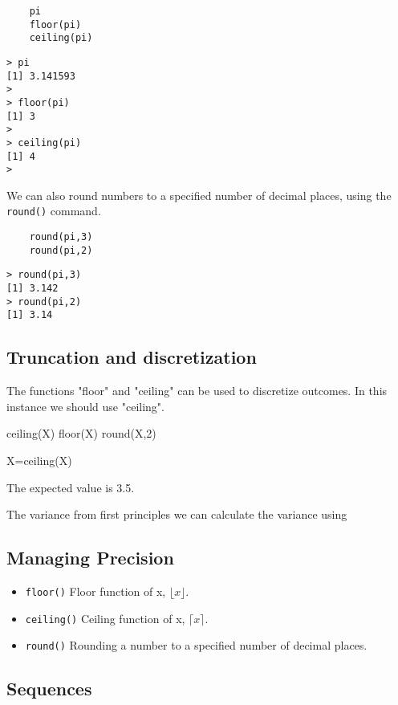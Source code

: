 \documentclass[a4paper,12pt]{article}
\begin{document}
\begin{framed}
	\begin{verbatim}
	pi
	floor(pi)
	ceiling(pi)
	\end{verbatim}
\end{framed}
\begin{verbatim}
> pi
[1] 3.141593
>
> floor(pi)
[1] 3
>
> ceiling(pi)
[1] 4
>
\end{verbatim}
We can also round numbers to a specified number of decimal places, using the \texttt{round()} command.
\begin{framed}
	\begin{verbatim}
	round(pi,3)
	round(pi,2)
	\end{verbatim}
\end{framed}
\begin{verbatim}
> round(pi,3)
[1] 3.142
> round(pi,2)
[1] 3.14
\end{verbatim}


\subsection{Truncation and discretization}

The functions "floor" and "ceiling" can be used to discretize outcomes. In this instance we should use "ceiling".

ceiling(X)
floor(X)
round(X,2)

X=ceiling(X)



The expected value is 3.5.

The variance from first principles we can calculate the variance using

\subsection{Managing Precision}

\begin{itemize}
	\item \texttt{floor()} Floor function of x, $\lfloor x \rfloor$.
	\item \texttt{ceiling()} Ceiling function of x, $\lceil x \rceil$.
	\item \texttt{round()} Rounding a number to a specified number of decimal places.
\end{itemize}

\subsection{Sequences}
\end{document}
